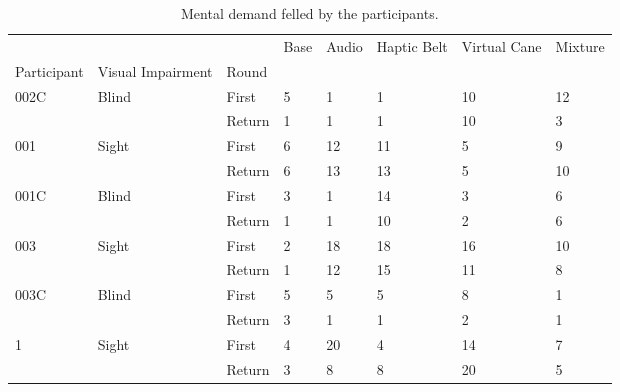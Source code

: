 
\begin{table}[!htb]
\centering
\caption{Mental demand felled by the participants.}
\label{tab:md_table}
\begin{tabular}{llllllll}
\toprule
  &       &        & Base & Audio & Haptic Belt & Virtual Cane & Mixture \\
Participant & Visual Impairment & Round &      &       &             &              &         \\
\midrule
002C & Blind & First &    5 &     1 &           1 &           10 &      12 \\
  &       & Return &    1 &     1 &           1 &           10 &       3 \\
001 & Sight & First &    6 &    12 &          11 &            5 &       9 \\
  &       & Return &    6 &    13 &          13 &            5 &      10 \\
001C & Blind & First &    3 &     1 &          14 &            3 &       6 \\
  &       & Return &    1 &     1 &          10 &            2 &       6 \\
003 & Sight & First &    2 &    18 &          18 &           16 &      10 \\
  &       & Return &    1 &    12 &          15 &           11 &       8 \\
003C & Blind & First &    5 &     5 &           5 &            8 &       1 \\
  &       & Return &    3 &     1 &           1 &            2 &       1 \\
1 & Sight & First &    4 &    20 &           4 &           14 &       7 \\
  &       & Return &    3 &     8 &           8 &           20 &       5 \\
\bottomrule
\end{tabular}
\end{table}

